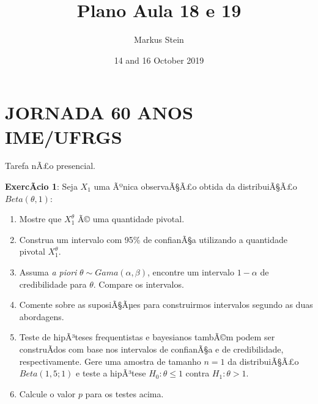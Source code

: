 \documentclass[]{article}
\title{Plano Aula 18 e 19}
\author{Markus Stein}
\date{14 and 16 October 2019}
\providecommand{\tightlist}{%
  \setlength{\itemsep}{0pt}\setlength{\parskip}{0pt}}
\begin{document}
\maketitle

\addtolength{\headheight}{1.0cm} \pagestyle{fancyplain}
 \renewcommand{\headrulewidth}{0pt}

\section{JORNADA 60 ANOS IME/UFRGS}\label{jornada-60-anos-imeufrgs}

Tarefa nÃ£o presencial.

\textbf{ExercÃ­cio 1}: Seja \(X_1\) uma Ãºnica observaÃ§Ã£o obtida da
distribuiÃ§Ã£o \(Beta(\theta,1)\):

\begin{enumerate}
\def\labelenumi{\alph{enumi})}
\tightlist
\item
  Mostre que \(X_1^{\theta}\) Ã© uma quantidade pivotal.
\item
  Construa um intervalo com 95\% de confianÃ§a utilizando a quantidade
  pivotal \(X_1^{\theta}\).
\item
  Assuma \emph{a piori} \(\theta \sim Gama(\alpha, \beta)\), encontre um
  intervalo \(1 - \alpha\) de credibilidade para \(\theta\). Compare os
  intervalos.
\item
  Comente sobre as suposiÃ§Ãµes para construirmos intervalos segundo as
  duas abordagens.
\item
  Teste de hipÃ³teses frequentistas e bayesianos tambÃ©m podem ser
  construÃ­dos com base nos intervalos de confianÃ§a e de credibilidade,
  respectivamente. Gere uma amostra de tamanho \(n=1\) da distribuiÃ§Ã£o
  \(Beta(1,5; 1)\) e teste a hipÃ³tese \(H_0 : \theta \leq 1\) contra
  \(H_1: \theta > 1\).
\item
  Calcule o valor \(p\) para os testes acima.
\end{enumerate}
\end{document}
